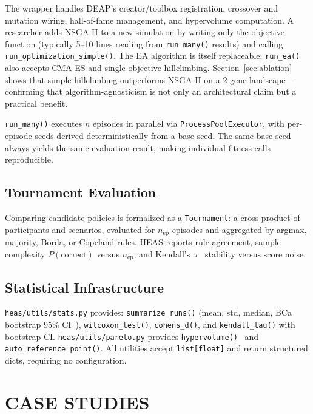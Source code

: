 \documentclass{wscpaperproc}
\begin{document}
The wrapper handles DEAP's creator/toolbox registration, crossover and mutation
wiring, hall-of-fame management, and hypervolume computation. A researcher
adds NSGA-II to a new simulation by writing only the objective function
(typically 5--10 lines reading from \texttt{run\_many()} results) and calling
\texttt{run\_optimization\_simple()}. The EA algorithm is itself replaceable:
\texttt{run\_ea()} also accepts CMA-ES and single-objective hillclimbing.
Section~\ref{sec:ablation} shows that simple hillclimbing outperforms NSGA-II
on a 2-gene landscape---confirming that algorithm-agnosticism is not only an
architectural claim but a practical benefit.

\texttt{run\_many()} executes $n$ episodes in parallel via
\texttt{ProcessPoolExecutor}, with per-episode seeds derived deterministically
from a base seed. The same base seed always yields the same evaluation result,
making individual fitness calls reproducible.

\subsection{Tournament Evaluation}

Comparing candidate policies is formalized as a \texttt{Tournament}: a
cross-product of participants and scenarios, evaluated for $n_\text{ep}$
episodes and aggregated by argmax, majority, Borda, or Copeland rules.
HEAS reports rule agreement, sample complexity $P(\text{correct})$ versus
$n_\text{ep}$, and Kendall's~$\tau$~\cite{kendall1938new} stability versus
score noise.

\subsection{Statistical Infrastructure}

\texttt{heas/utils/stats.py} provides: \texttt{summarize\_runs()} (mean, std,
median, BCa bootstrap 95\% CI~\cite{efron1994bootstrap}),
\texttt{wilcoxon\_test()}, \texttt{cohens\_d()}, and
\texttt{kendall\_tau()} with bootstrap CI.
\texttt{heas/utils/pareto.py} provides \texttt{hypervolume()}~\cite{zitzler1998hypervolume}
and \texttt{auto\_reference\_point()}. All utilities accept \texttt{list[float]}
and return structured dicts, requiring no configuration.

\section{CASE STUDIES}
\end{document}

